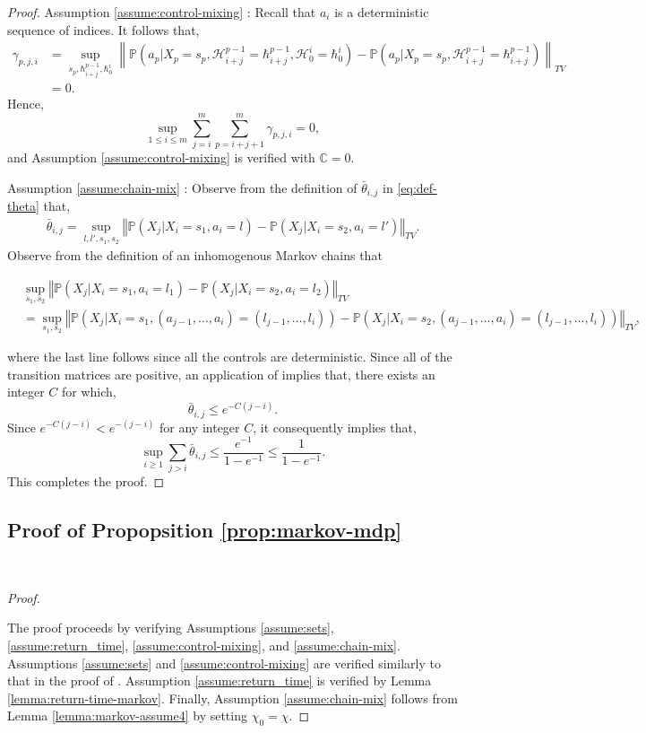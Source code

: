 \documentclass[opre,sglanonrev]{informs4}
\numberwithin{equation}{section}
\newcommand{\lp}{\left(}
\newcommand{\rp}{\right)}
\newcommand{\lV}{\left\|}
\newcommand{\rV}{\right\|}
\newcommand{\History}{\mathcal{H}}
\newcommand{\history}{\hbar}
\newcommand{\Cbb}{\mathbb{C}}
\newcommand{\Pbb}{\mathbb{P}}
\newcommand{\constant}{\Cbb}
\newcommand{\prob}{\Pbb}
\newcommand{\probl}{\prob}
\newcommand{\nrm}[1]{\left\Vert #1 \right\Vert}
\begin{document}
\begin{APPENDICES}
\begin{proof}
{Assumption \ref{assume:control-mixing} :}
Recall that $a_i$ is a deterministic sequence of indices. It follows that,
\begin{align*}
\gamma_{p,j,i} & = \sup_{s_p,\history_{i+j}^{p-1},\history_0^i}\lV\probl\lp a_p|X_p=s_p,\History_{i+j}^{p-1}=\history_{i+j}^{p-1},\History_0^i=\history_{0}^{i}\rp-\probl\lp a_p|X_p=s_p,\History_{i+j}^{p-1}=\history_{i+j}^{p-1}\rp\rV_{TV}\\
& = 0.
\end{align*}
Hence,
\[
\sup_{1\leq i\leq m}\sum_{j=i}^{m} \sum_{p=i+j+1}^m \gamma_{p,j,i}=0,
\]
and Assumption \ref{assume:control-mixing} is verified with $\constant=0$. 

Assumption \ref{assume:chain-mix} :
Observe from the definition of $\bar \theta_{i,j}$ in \cref{eq:def-theta} that,
\begin{align*}
\bar \theta_{i,j} =\sup_{l,l',s_1,s_2} \nrm{\probl\lp X_j|X_i=s_1,a_i=l \rp-\probl\lp X_j|X_i=s_2,a_i=l'\rp}_{TV}.
\end{align*}
Observe from the definition of an inhomogenous Markov chains that 
\begin{small}
\begin{align*}
    & \sup_{s_1,s_2} \nrm{\probl\lp X_j|X_i=s_1,a_i=l_1 \rp-\probl\lp X_j|X_i=s_2,a_i=l_2\rp}_{TV}\\
    & = \sup_{s_1,s_2} \nrm{\probl\lp X_j|X_i=s_1,(a_{j-1},\dots,a_i)=(l_{j-1},\dots,l_i) \rp-\probl\lp X_j|X_i=s_2,(a_{j-1},\dots,a_i)=(l_{j-1},\dots,l_i)\rp}_{TV},
\end{align*}
\end{small}

where the last line follows since all the controls are deterministic. Since all of the transition matrices are positive, an application of \citet[Theorem 1]{wolfowitz1963products} implies that, there exists an integer $C$ for which, 
\[
\bar \theta_{i,j}\leq e^{-C(j-i)}.
\]
Since $e^{-C(j-i)}<e^{-(j-i)}$ for any integer $C$, it consequently implies that,
\[
\sup_{i\geq 1}\sum_{j>i} \bar \theta_{i,j}\leq \frac{e^{-1}}{1-e^{-1}}\leq \frac{1}{1-e^{-1}}. 
\]
This completes the proof.
\end{proof}
\subsection{Proof of Propopsition \ref{prop:markov-mdp}}~\label{prf:markov-mdp}
\begin{proof} \ 

The proof proceeds by verifying Assumptions \ref{assume:sets}, \ref{assume:return_time},  \ref{assume:control-mixing}, and \ref{assume:chain-mix}.
Assumptions {\ref{assume:sets} and \ref{assume:control-mixing}} are verified similarly to that in the proof of .
{Assumption \ref{assume:return_time}} is verified by Lemma \ref{lemma:return-time-markov}. Finally, { Assumption \ref{assume:chain-mix}} follows from Lemma \ref{lemma:markov-assume4} by setting $\chi_0=\chi$. 
\end{proof}
{
}
\end{APPENDICES}
\end{document}
